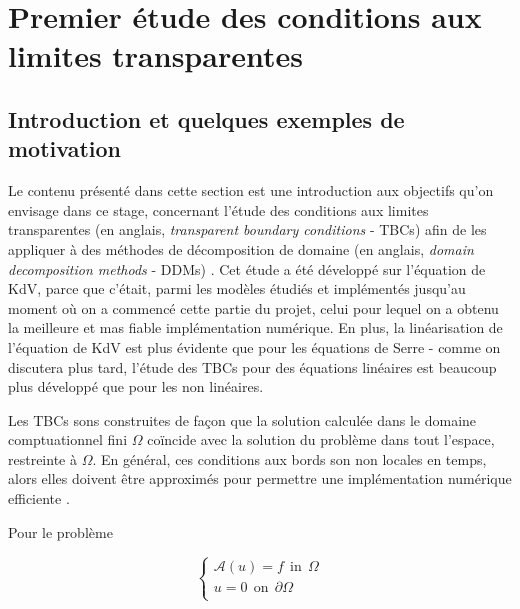 \section{Premier étude des conditions aux limites transparentes}
\label{sec:TBC}

\subsection{Introduction et quelques exemples de motivation}

\indent Le contenu présenté dans cette section est une introduction aux objectifs qu'on envisage dans ce stage, concernant l'étude des conditions aux limites transparentes (en anglais, \emph{transparent boundary conditions} - TBCs) afin de les appliquer à des méthodes de décomposition de domaine (en anglais, \emph{domain decomposition methods} - DDMs) . Cet étude a été développé sur l'équation de KdV, parce que c'était, parmi les modèles étudiés et implémentés jusqu'au moment où on a commencé cette partie du projet, celui pour lequel on a obtenu la meilleure et mas fiable implémentation numérique. En plus, la linéarisation de l'équation de KdV est plus évidente que pour les équations de Serre - comme on discutera plus tard, l'étude des TBCs pour des équations linéaires est beaucoup plus développé que pour les non linéaires.

\indent Les TBCs sons construites de façon que la solution calculée dans le domaine comptuationnel fini $\Omega$ coïncide avec la solution du problème dans tout l'espace, restreinte à $\Omega$. En général, ces conditions aux bords son non locales en temps, alors elles doivent être approximés pour permettre une implémentation numérique efficiente \cite{Xavieretal2008}.


\indent Pour le problème

\begin{equation*}
\begin{cases}
\mathcal{A}(u) = f \ \ \text{in} \ \ \Omega\\
u = 0 \ \ \text{on} \ \ \partial\Omega\\
\end{cases}
\end{equation*}

